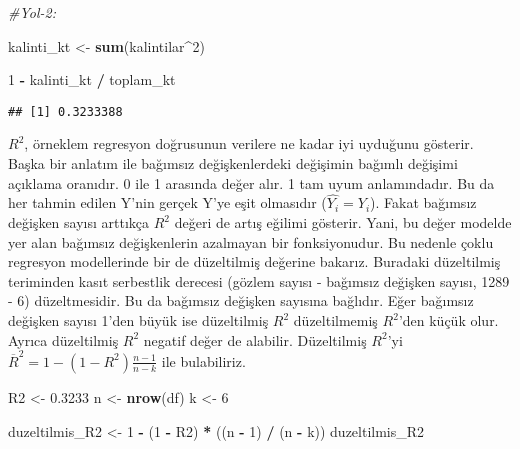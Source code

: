 \documentclass[
]{book}
\newenvironment{Shaded}{\begin{snugshade}}{\end{snugshade}}
\newcommand{\CommentTok}[1]{\textcolor[rgb]{0.56,0.35,0.01}{\textit{#1}}}
\newcommand{\DecValTok}[1]{\textcolor[rgb]{0.00,0.00,0.81}{#1}}
\newcommand{\FloatTok}[1]{\textcolor[rgb]{0.00,0.00,0.81}{#1}}
\newcommand{\KeywordTok}[1]{\textcolor[rgb]{0.13,0.29,0.53}{\textbf{#1}}}
\newcommand{\NormalTok}[1]{#1}
\newcommand{\OperatorTok}[1]{\textcolor[rgb]{0.81,0.36,0.00}{\textbf{#1}}}
\newcommand{\StringTok}[1]{\textcolor[rgb]{0.31,0.60,0.02}{#1}}
\begin{document}
\begin{Shaded}
\begin{Highlighting}[]
\CommentTok{#Yol-2:}

\NormalTok{kalinti_kt <-}\StringTok{ }\KeywordTok{sum}\NormalTok{(kalintilar}\OperatorTok{^}\DecValTok{2}\NormalTok{)}

\DecValTok{1} \OperatorTok{-}\StringTok{ }\NormalTok{kalinti_kt }\OperatorTok{/}\StringTok{ }\NormalTok{toplam_kt}
\end{Highlighting}
\end{Shaded}

\begin{verbatim}
## [1] 0.3233388
\end{verbatim}

\(R^2\), örneklem regresyon doğrusunun verilere ne kadar iyi uyduğunu gösterir. Başka bir anlatım ile bağımsız değişkenlerdeki değişimin bağımlı değişimi açıklama oranıdır. 0 ile 1 arasında değer alır. 1 tam uyum anlamındadır. Bu da her tahmin edilen Y'nin gerçek Y'ye eşit olmasıdır (\(\hat{Y_i} = Y_i\)). Fakat bağımsız değişken sayısı arttıkça \(R^2\) değeri de artış eğilimi gösterir. Yani, bu değer modelde yer alan bağımsız değişkenlerin azalmayan bir fonksiyonudur. Bu nedenle çoklu regresyon modellerinde bir de düzeltilmiş değerine bakarız. Buradaki düzeltilmiş teriminden kasıt serbestlik derecesi (gözlem sayısı - bağımsız değişken sayısı, 1289 - 6) düzeltmesidir. Bu da bağımsız değişken sayısına bağlıdır. Eğer bağımsız değişken sayısı 1'den büyük ise düzeltilmiş \(R^2\) düzeltilmemiş \(R^2\)'den küçük olur. Ayrıca düzeltilmiş \(R^2\) negatif değer de alabilir. Düzeltilmiş \(R^2\)'yi \(\overline{R}^2 = 1 - (1 - R^2)\frac{n-1}{n-k}\) ile bulabiliriz.

\begin{Shaded}
\begin{Highlighting}[]
\NormalTok{R2 <-}\StringTok{ }\FloatTok{0.3233}
\NormalTok{n <-}\StringTok{ }\KeywordTok{nrow}\NormalTok{(df)}
\NormalTok{k <-}\StringTok{ }\DecValTok{6}

\NormalTok{duzeltilmis_R2 <-}\StringTok{ }\DecValTok{1} \OperatorTok{-}\StringTok{ }\NormalTok{(}\DecValTok{1} \OperatorTok{-}\StringTok{ }\NormalTok{R2) }\OperatorTok{*}\StringTok{ }\NormalTok{((n }\OperatorTok{-}\StringTok{ }\DecValTok{1}\NormalTok{) }\OperatorTok{/}\StringTok{ }\NormalTok{(n }\OperatorTok{-}\StringTok{ }\NormalTok{k))}
\NormalTok{duzeltilmis_R2}
\end{Highlighting}
\end{Shaded}
\end{document}
